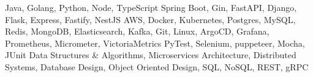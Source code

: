 




\addvspace{-1.5ex}
\begin{cvskills}
    {Java, Golang, Python, Node, TypeScript}
    {Spring Boot, Gin, FastAPI, Django, Flask, Express, Fastify, NestJS}
    {AWS, Docker, Kubernetes, Postgres, MySQL, Redis, MongoDB, Elasticsearch, Kafka, Git, Linux, ArgoCD, Grafana,
    Prometheus, Micrometer, VictoriaMetrics}
    {PyTest, Selenium, puppeteer, Mocha, JUnit}
    {Data Structures \& Algorithms, Microservices Architecture, Distributed Systems, Database Design, Object Oriented Design, SQL, NoSQL, REST, gRPC}
\end{cvskills}
\addvspace{1.5ex}